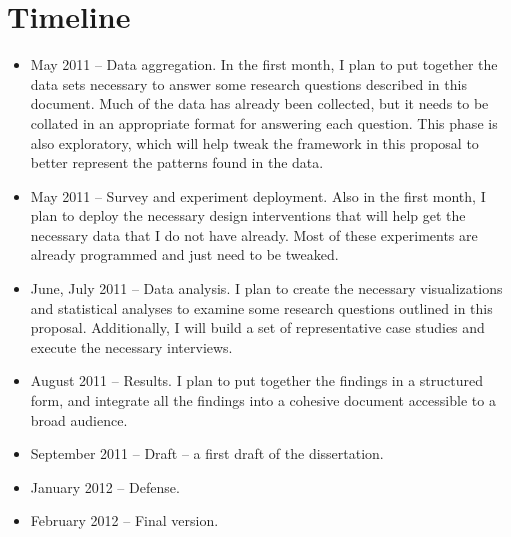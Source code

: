 \section{Timeline}
\begin{itemize}
\item May 2011 -- Data aggregation. In the first month, I plan to put together the data sets necessary to answer some research questions described in this document. Much of the data has already been collected, but it needs to be collated in an appropriate format for answering each question.
This phase is also exploratory, which will help tweak the framework in this proposal to better represent the patterns found in the data.
\item May 2011 -- Survey and experiment deployment. Also in the first month, I plan to deploy the necessary design interventions that will help get the necessary data that I do not have already. Most of these experiments are already programmed and just need to be tweaked.
\item June, July 2011 -- Data analysis. I plan to create the necessary visualizations and statistical analyses to examine some research questions outlined in this proposal. Additionally, I will build a set of representative case studies and execute the necessary interviews.
\item August 2011 -- Results. I plan to put together the findings in a structured form, and integrate all the findings into a cohesive document accessible to a broad audience.
\item September 2011 -- Draft -- a first draft of the dissertation.
\item January 2012 -- Defense.
\item February 2012 -- Final version.
\end{itemize}
